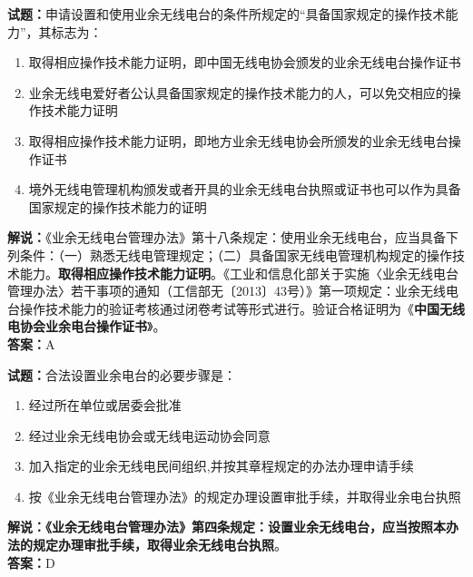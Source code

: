\documentclass{ctexbook}
\begin{document}
\bigskip

\noindent\textbf{试题：}申请设置和使用业余无线电台的条件所规定的“具备国家规定的操作技术能力”，其标志为：
\begin{enumerate}[leftmargin=3em]
  \item 取得相应操作技术能力证明，即中国无线电协会颁发的业余无线电台操作证书
  \item 业余无线电爱好者公认具备国家规定的操作技术能力的人，可以免交相应的操作技术能力证明
  \item 取得相应操作技术能力证明，即地方业余无线电协会所颁发的业余无线电台操作证书
  \item 境外无线电管理机构颁发或者开具的业余无线电台执照或证书也可以作为具备国家规定的操作技术能力的证明
\end{enumerate}
\noindent\textbf{解说：}《业余无线电台管理办法》第十八条规定：使用业余无线电台，应当具备下列条件：（一）熟悉无线电管理规定；（二）具备国家无线电管理机构规定的操作技术能力。\textbf{取得相应操作技术能力证明}。《工业和信息化部关于实施〈业余无线电台管理办法〉若干事项的通知（工信部无〔2013〕43号）》第一项规定：业余无线电台操作技术能力的验证考核通过闭卷考试等形式进行。验证合格证明为《\textbf{中国无线电协会业余电台操作证书}》。\\\noindent\textbf{答案：}A

\bigskip

\noindent\textbf{试题：}合法设置业余电台的必要步骤是：
\begin{enumerate}[leftmargin=3em]
  \item 经过所在单位或居委会批准
  \item 经过业余无线电协会或无线电运动协会同意
  \item 加入指定的业余无线电民间组织,并按其章程规定的办法办理申请手续
  \item 按《业余无线电台管理办法》的规定办理设置审批手续，并取得业余电台执照
\end{enumerate}
\noindent\textbf{解说：}\textbf{《业余无线电台管理办法》第四条规定：设置业余无线电台，应当按照本办法的规定办理审批手续，取得业余无线电台执照}。\\\noindent\textbf{答案：}D

\bigskip
\end{document}
